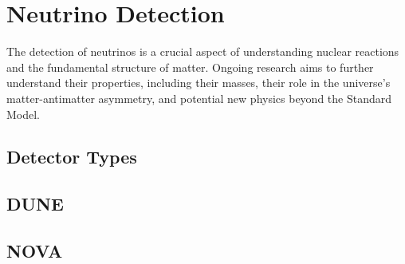 \section{Neutrino Detection}

The detection of neutrinos is a crucial aspect of understanding nuclear reactions and the fundamental structure of matter.
Ongoing research aims to further understand their properties, including their masses, their role in the universe's matter-antimatter asymmetry, and potential new physics beyond the Standard Model.


  \subsection{Detector Types}

  \subsection{DUNE}

  \subsection{NOVA}
